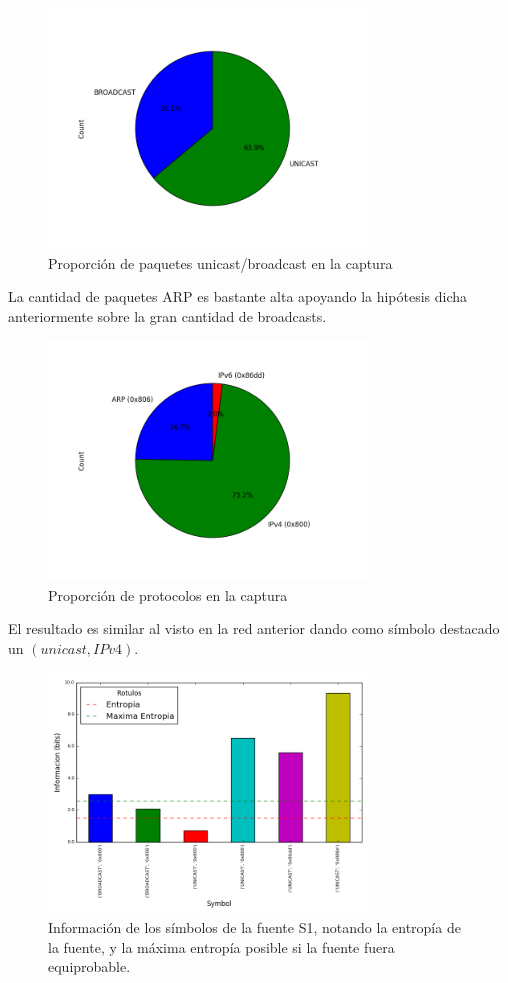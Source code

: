 \begin{figure}[H]
 \centering
 \includegraphics[width=8.5cm]{figs/broadcast_proportion_oficina_mediana_wifi_S1_output.png}
 \caption{\normalfont Proporción de paquetes unicast/broadcast en la captura}
\end{figure}

La cantidad de paquetes ARP es bastante alta apoyando la hipótesis dicha anteriormente sobre la gran cantidad de broadcasts.

\begin{figure}[H]
 \centering
 \includegraphics[width=8.5cm]{figs/protocols_proportion_oficina_mediana_wifi_S1_output.png}
 \caption{\normalfont Proporción de protocolos en la captura}
\end{figure}

El resultado es similar al visto en la red anterior dando como símbolo destacado un $(unicast, IPv4)$.

\begin{figure}[H]
 \centering
 \includegraphics[width=8.5cm]{figs/information_oficina_mediana_wifi_S1_output.png}
 \caption{\normalfont Información de los símbolos de la fuente S1, notando la entropía de la fuente, y la máxima entropía posible si la fuente fuera equiprobable.}
\end{figure}

